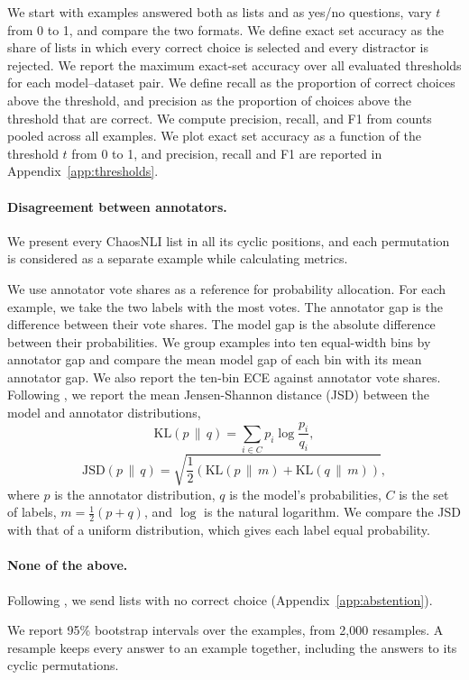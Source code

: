 We start with examples answered both as lists and as yes/no questions, vary $t$ from 0 to 1, and compare the two formats. We define exact set accuracy as the share of lists in which every correct choice is selected and every distractor is rejected. We report the maximum exact-set accuracy over all evaluated thresholds for each model–dataset pair. We define recall as the proportion of correct choices above the threshold, and precision as the proportion of choices above the threshold that are correct. We compute precision, recall, and F1 from counts pooled across all examples. We plot exact set accuracy as a function of the threshold $t$ from 0 to 1, and precision, recall and F1 are reported in Appendix~\ref{app:thresholds}.

\paragraph{Disagreement between annotators.}
We present every ChaosNLI list in all its cyclic positions, and each permutation is considered as a separate example while calculating metrics.

We use annotator vote shares as a reference for probability allocation. For each example, we take the two labels with the most votes. The annotator gap is the difference between their vote shares. The model gap is the absolute difference between their probabilities. We group examples into ten equal-width bins by annotator gap and compare the mean model gap of each bin with its mean annotator gap. We also report the ten-bin ECE against annotator vote shares. Following \citet{nie2020chaosnli}, we report the mean Jensen-Shannon distance (JSD) between the model and annotator distributions,
\begin{equation}
\mathrm{KL}(p \,\|\, q) = \sum_{i \in C} p_i \log \frac{p_i}{q_i},
\end{equation}
\begin{equation}
\mathrm{JSD}(p \,\|\, q) = \sqrt{\frac{1}{2}\left(\mathrm{KL}(p \,\|\, m) + \mathrm{KL}(q \,\|\, m)\right)},
\end{equation}
where $p$ is the annotator distribution, $q$ is the model's probabilities, $C$ is the set of labels, $m = \frac{1}{2}(p + q)$, and $\log$ is the natural logarithm. We compare the JSD with that of a uniform distribution, which gives each label equal probability.

\paragraph{None of the above.}
Following \citet{tam2025none}, we send lists with no correct choice (Appendix~\ref{app:abstention}).

We report 95\% bootstrap intervals over the examples, from 2,000 resamples. A resample keeps every answer to an example together, including the answers to its cyclic permutations.
